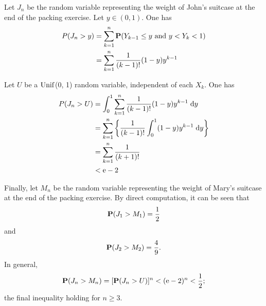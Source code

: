 \documentclass[british,a4paper]{article}
\begin{document}
Let \(J_n\) be the random variable representing the weight of John's suitcase at the end of the packing exercise. Let \(y \in (0, 1)\). One has
\begin{equation*}
    \begin{split}
        P(J_n > y) &= \sum_{k = 1}^n \operatorname{\mathbf{P}}(Y_{k - 1} \leq y \text{ and } y < Y_k < 1)\\
        &= \sum_{k = 1}^n \frac{1}{(k - 1)!}(1- y)y^{k - 1}
    \end{split}
\end{equation*}

Let \(U\) be a \(\operatorname{Unif}\)(0, 1) random variable, independent of each \(X_k\). One has
\begin{equation*}
    \begin{split}
        P(J_n > U) &= \int_0^1 \sum_{k = 1}^n \frac{1}{(k - 1)!}(1- y)y^{k - 1} \;\mathrm{d} y\\
        &= \sum_{k = 1}^n \left\{ \frac{1}{(k - 1)!}\int_0^1 (1- y)y^{k - 1} \;\mathrm{d} y\right\}\\
        &= \sum_{k = 1}^n \frac{1}{(k + 1)!}\\
        &< \mathrm{e} - 2
    \end{split}
\end{equation*}

Finally, let \(M_n\) be the random variable representing the weight of Mary's suitcase at the end of the packing exercise. By direct computation, it can be seen that
\[
\operatorname{\mathbf{P}}(J_1 > M_1) = \frac{1}{2}
\]
and
\[
\operatorname{\mathbf{P}}(J_2 > M_2) = \frac{4}{9}\text{.}
\]
In general,
\[
\operatorname{\mathbf{P}}(J_n > M_n) = [\operatorname{\mathbf{P}}(J_n > U)]^n < (\mathrm{e} - 2)^n < \frac{1}{2}\text{;}
\]
the final inequality holding for \(n \geq 3\). 
\end{document}
